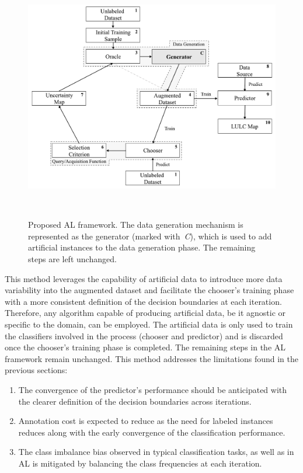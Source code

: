 \documentclass[preprint,12pt]{elsarticle}
\begin{document}
\begin{figure}[htb]
	\centering
	\includegraphics[width=\linewidth]{../analysis/al_new}
    \caption{Proposed AL framework. The data generation mechanism is
        represented as the generator (marked with~\textit{C}), which is used to add artificial
        instances to the data generation phase. The remaining steps are left
        unchanged.
    }~\label{fig:al_new}
\end{figure}

This method leverages the capability of artificial data to introduce more data
variability into the augmented dataset and facilitate the chooser's training
phase with a more consistent definition of the decision boundaries at each
iteration. Therefore, any algorithm capable of producing artificial data, be
it agnostic or specific to the domain, can be employed. The artificial data is
only used to train the classifiers involved in the process (chooser and
predictor) and is discarded once the chooser's training phase is completed.
The remaining steps in the AL framework remain unchanged. This method
addresses the limitations found in the previous sections: 

\begin{enumerate}
    \item The convergence of the predictor's performance should be anticipated
        with the clearer definition of the decision boundaries across
        iterations.
    \item Annotation cost is expected to reduce as the need for labeled
        instances reduces along with the early convergence of the
        classification performance.
    \item The class imbalance bias observed in typical classification tasks, as
        well as in AL is mitigated by balancing the class frequencies at each
        iteration.
\end{enumerate}
\end{document}
